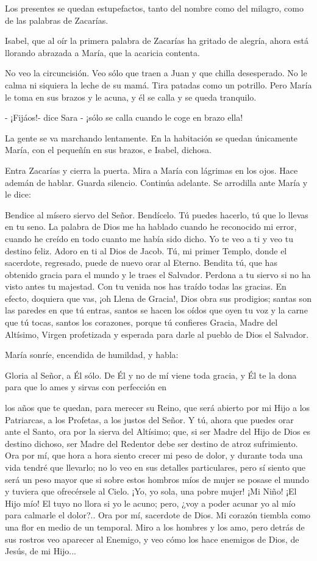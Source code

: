 \documentclass[12pt]{book} %
\begin{document}
Los presentes se quedan estupefactos, tanto del nombre como del milagro, como de las palabras de Zacarías. 

Isabel, que al oír la primera palabra de Zacarías ha gritado de alegría, ahora está llorando abrazada a María, que la acaricia contenta. 

No veo la circuncisión. Veo sólo que traen a Juan y que chilla desesperado. No le calma ni siquiera la leche de su mamá. Tira patadas como un potrillo. Pero María le toma en sus brazos y le acuna, y él se calla y se queda tranquilo. 

- ¡Fijáos!- dice Sara - ¡sólo se calla cuando le coge en brazo ella! 

La gente se va marchando lentamente. En la habitación se quedan únicamente María, con el pequeñín en sus brazos, e Isabel, dichosa. 

Entra Zacarías y cierra la puerta. Mira a María con lágrimas en los ojos. Hace ademán de hablar. Guarda silencio. Continúa adelante. Se arrodilla ante María y le dice: 

Bendice al mísero siervo del Señor. Bendícelo. Tú puedes hacerlo, tú que lo llevas en tu seno. La palabra de Dios me ha hablado cuando he reconocido mi error, cuando he creído en todo cuanto me había sido dicho. Yo te veo a ti y veo tu destino feliz. Adoro en ti al Dios de Jacob. Tú, mi primer Templo, donde el sacerdote, regresado, puede de nuevo orar al Eterno. Bendita tú, que has obtenido gracia para el mundo y le traes el Salvador. Perdona a tu siervo si no ha visto antes tu majestad. Con tu venida nos has traído todas las gracias. En efecto, doquiera que vas, ¡oh Llena de Gracia!, Dios obra sus prodigios; santas son las paredes en que tú entras, santos se hacen los oídos que oyen tu voz y la carne que tú tocas, santos los corazones, porque tú confieres Gracia, Madre del Altísimo, Virgen profetizada y esperada para darle al pueblo de Dios el Salvador. 

María sonríe, encendida de humildad, y habla: 

Gloria al Señor, a Él sólo. De Él y no de mí viene toda gracia, y Él te la dona para que lo ames y sirvas con perfección en 

los años que te quedan, para merecer su Reino, que será abierto por mi Hijo a los Patriarcas, a los Profetas, a los justos del Señor. Y tú, ahora que puedes orar ante el Santo, ora por la sierva del Altísimo; que, si ser Madre del Hijo de Dios es destino dichoso, ser Madre del Redentor debe ser destino de atroz sufrimiento. Ora por mí, que hora a hora siento crecer mi peso de dolor, y durante toda una vida tendré que llevarlo; no lo veo en sus detalles particulares, pero sí siento que será un peso mayor que si sobre estos hombros míos de mujer se posase el mundo y tuviera que ofrecérsele al Cielo. ¡Yo, yo sola, una pobre mujer! ¡Mi Niño! ¡El Hijo mío! El tuyo no llora si yo le acuno; pero, ¿voy a poder acunar yo al mío para calmarle el dolor?.. Ora por mí, sacerdote de Dios. Mi corazón tiembla como una flor en medio de un temporal. Miro a los hombres y los amo, pero detrás de sus rostros veo aparecer al Enemigo, y veo cómo los hace enemigos de Dios, de Jesús, de mi Hijo... 
\end{document}
